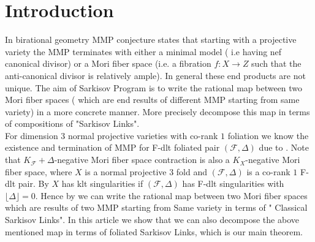 \documentclass[12pt]{amsart}%
\theoremstyle{plain}
\theoremstyle{remark}
\theoremstyle{definition}
\newcommand{\<}{\leq}
\theoremstyle{definition}
\theoremstyle{definition}
\numberwithin{equation}{section}
\theoremstyle{remark}
\begin{document}
\section{Introduction}
In birational geometry MMP conjecture states that starting with a projective variety the MMP terminates with either a minimal model ( i.e having nef canonical divisor) or a Mori fiber space (i.e. a fibration $f:X\rightarrow Z$ such that the anti-canonical divisor is relatively ample). In general these end products are not unique. The aim of Sarkisov Program is to write the rational map between two Mori fiber spaces ( which are end results of different MMP starting from same variety) in a more concrete manner. More precisely decompose this map in terms of compositions of "Sarkisov Links".\\
For dimension $3$ normal projective varieties with co-rank $1$ foliation we know the existence and termination of MMP for F-dlt foliated pair $(\mathcal{F},\Delta)$ due to \cite{CS21}. Note that $K_{\mathcal{F}}+\Delta$-negative Mori fiber space contraction is also a $K_X$-negative Mori fiber space, where $X$ is a normal projective $3$ fold and $(\mathcal{F},\Delta)$ is a co-rank $1$ F-dlt pair. By \cite[lemma $3.16$]{CS21} $X$ has klt singularities if $(\mathcal{F},\Delta)$ has F-dlt singularities with $\lfloor \Delta\rfloor=0$. Hence by \cite{HM09} we can write the rational map between two Mori fiber spaces which are results of two MMP starting from Same variety in terms of " Classical Sarkisov Links". In this article we show that we can also decompose the above mentioned map in terms of foliated Sarkisov Links, which is our main theorem.
\end{document}
